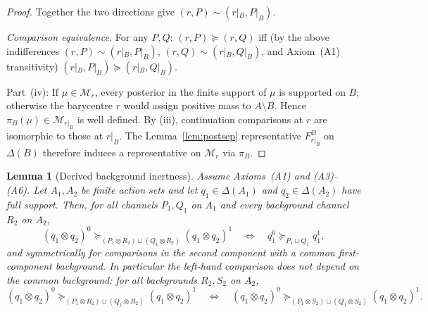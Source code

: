 \documentclass[11pt,a4paper]{article}
\newtheorem{lemma}[theorem]{Lemma}
\theoremstyle{definition}
\newcommand{\1}{\mathbf 1}
\begin{document}
\begin{proof}
Together the two directions give $(r,P)\sim(r|_B,P|_B)$.

\emph{Comparison equivalence.}  For any $P,Q$: $(r,P)\succeq(r,Q)$ iff (by the above indifferences $(r,P)\sim(r|_B,P|_B)$,
$(r,Q)\sim(r|_B,Q|_B)$, and Axiom~\textup{(A1)} transitivity) $(r|_B,P|_B)\succeq(r|_B,Q|_B)$.

Part~(iv): If $\mu\in\mathcal M_r$, every posterior in the finite support of $\mu$ is supported on $B$; otherwise the
barycentre $r$ would assign positive mass to $A\setminus B$.  Hence $\pi_B(\mu)\in\mathcal M_{r|_B}$ is well defined.
By (iii), continuation comparisons at $r$ are isomorphic to those at $r|_B$.  The Lemma~\ref{lem:postsep} representative
$F_{r|_B}^B$ on $\Delta(B)$ therefore induces a representative on $\mathcal M_r$ via $\pi_B$.
\end{proof}

\begin{lemma}[Derived background inertness]\label{lem:background}
Assume Axioms~\textup{(A1)} and \textup{(A3)}--\textup{(A6)}.  Let $A_1,A_2$ be finite action sets and let
$q_1\in\Delta(A_1)$ and $q_2\in\Delta(A_2)$ have full support.  Then, for all channels $P_1,Q_1$ on $A_1$ and every
background channel $R_2$ on $A_2$,
\begin{equation}
(q_1\otimes q_2)^0
\succeq_{(P_1\otimes R_2)\sqcup(Q_1\otimes R_2)}
(q_1\otimes q_2)^1
\quad\Longleftrightarrow\quad
q_1^0\succeq_{P_1\sqcup Q_1}q_1^1,
\tag{BI}\label{eq:backgroundinert}
\end{equation}
and symmetrically for comparisons in the second component with a common first-component background.  In particular the
left-hand comparison does not depend on the common background: for all backgrounds $R_2,S_2$ on $A_2$,
\[
(q_1\otimes q_2)^0
\succeq_{(P_1\otimes R_2)\sqcup(Q_1\otimes R_2)}
(q_1\otimes q_2)^1
\quad\Longleftrightarrow\quad
(q_1\otimes q_2)^0
\succeq_{(P_1\otimes S_2)\sqcup(Q_1\otimes S_2)}
(q_1\otimes q_2)^1.
\]
\end{lemma}
\end{document}
